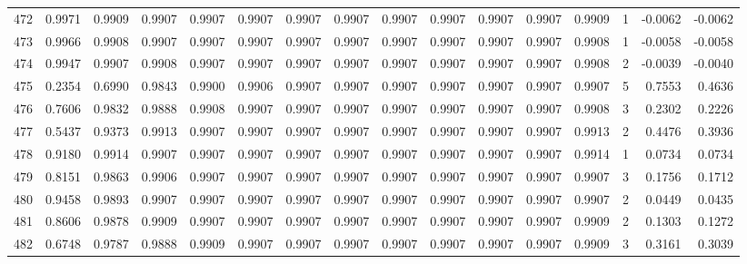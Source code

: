 \begin{tabular}{lrrrrrrrrrrrrrrr}
472 &      0.9971 &  0.9909 &  0.9907 &  0.9907 &  0.9907 &  0.9907 &  0.9907 &  0.9907 &  0.9907 &  0.9907 &   0.9907 &     0.9909 &      1 &                   -0.0062 &                    -0.0062 \\
473 &      0.9966 &  0.9908 &  0.9907 &  0.9907 &  0.9907 &  0.9907 &  0.9907 &  0.9907 &  0.9907 &  0.9907 &   0.9907 &     0.9908 &      1 &                   -0.0058 &                    -0.0058 \\
474 &      0.9947 &  0.9907 &  0.9908 &  0.9907 &  0.9907 &  0.9907 &  0.9907 &  0.9907 &  0.9907 &  0.9907 &   0.9907 &     0.9908 &      2 &                   -0.0039 &                    -0.0040 \\
475 &      0.2354 &  0.6990 &  0.9843 &  0.9900 &  0.9906 &  0.9907 &  0.9907 &  0.9907 &  0.9907 &  0.9907 &   0.9907 &     0.9907 &      5 &                    0.7553 &                     0.4636 \\
476 &      0.7606 &  0.9832 &  0.9888 &  0.9908 &  0.9907 &  0.9907 &  0.9907 &  0.9907 &  0.9907 &  0.9907 &   0.9907 &     0.9908 &      3 &                    0.2302 &                     0.2226 \\
477 &      0.5437 &  0.9373 &  0.9913 &  0.9907 &  0.9907 &  0.9907 &  0.9907 &  0.9907 &  0.9907 &  0.9907 &   0.9907 &     0.9913 &      2 &                    0.4476 &                     0.3936 \\
478 &      0.9180 &  0.9914 &  0.9907 &  0.9907 &  0.9907 &  0.9907 &  0.9907 &  0.9907 &  0.9907 &  0.9907 &   0.9907 &     0.9914 &      1 &                    0.0734 &                     0.0734 \\
479 &      0.8151 &  0.9863 &  0.9906 &  0.9907 &  0.9907 &  0.9907 &  0.9907 &  0.9907 &  0.9907 &  0.9907 &   0.9907 &     0.9907 &      3 &                    0.1756 &                     0.1712 \\
480 &      0.9458 &  0.9893 &  0.9907 &  0.9907 &  0.9907 &  0.9907 &  0.9907 &  0.9907 &  0.9907 &  0.9907 &   0.9907 &     0.9907 &      2 &                    0.0449 &                     0.0435 \\
481 &      0.8606 &  0.9878 &  0.9909 &  0.9907 &  0.9907 &  0.9907 &  0.9907 &  0.9907 &  0.9907 &  0.9907 &   0.9907 &     0.9909 &      2 &                    0.1303 &                     0.1272 \\
482 &      0.6748 &  0.9787 &  0.9888 &  0.9909 &  0.9907 &  0.9907 &  0.9907 &  0.9907 &  0.9907 &  0.9907 &   0.9907 &     0.9909 &      3 &                    0.3161 &                     0.3039 \\

\end{tabular}
